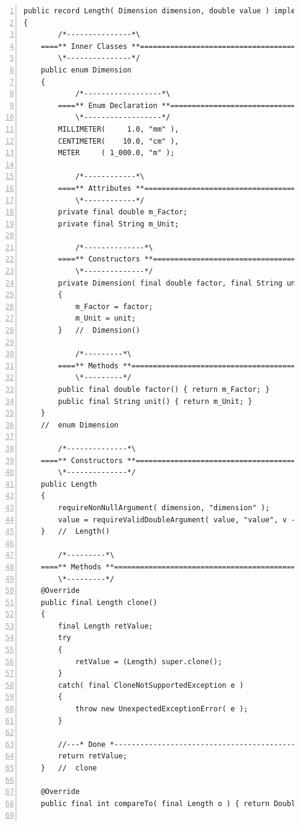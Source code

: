 \documentclass[11pt,a4paper, titlepage, parskip=half, headsepline, footsepline, cleardoublepage=current, headheight=1cm]{scrbook}
\begin{document}
\begin{lstlisting}[numbers=left,caption={Dimensioned Value Length}]
public record Length( Dimension dimension, double value ) implements Cloneable, Comparable<Length>
{
        /*---------------*\
    ====** Inner Classes **==========================================
        \*---------------*/
    public enum Dimension
    {
            /*------------------*\
        ====** Enum Declaration **===================================
            \*------------------*/
        MILLIMETER(     1.0, "mm" ),
        CENTIMETER(    10.0, "cm" ),
        METER     ( 1_000.0, "m" );

            /*------------*\
        ====** Attributes **=========================================
            \*------------*/
        private final double m_Factor;
        private final String m_Unit;

            /*--------------*\
        ====** Constructors **=======================================
            \*--------------*/
        private Dimension( final double factor, final String unit )
        {
            m_Factor = factor;
            m_Unit = unit;
        }   //  Dimension()

            /*---------*\
        ====** Methods **============================================
            \*---------*/
        public final double factor() { return m_Factor; }
        public final String unit() { return m_Unit; }
    }
    //  enum Dimension

        /*--------------*\
    ====** Constructors **===========================================
        \*--------------*/
    public Length
    {
        requireNonNullArgument( dimension, "dimension" );
        value = requireValidDoubleArgument( value, "value", v -> v > 0.0 ) * dimension.factor();
    }   //  Length()

        /*---------*\
    ====** Methods **================================================
        \*---------*/
    @Override
    public final Length clone()
    {
        final Length retValue;
        try
        {
            retValue = (Length) super.clone();
        }
        catch( final CloneNotSupportedException e )
        {
            throw new UnexpectedExceptionError( e );
        }

        //---* Done *------------------------------------------------
        return retValue;
    }   //  clone
    
    @Override
    public final int compareTo( final Length o ) { return Double.compare( value, o.value ); }
    

\end{lstlisting}
\end{document}
